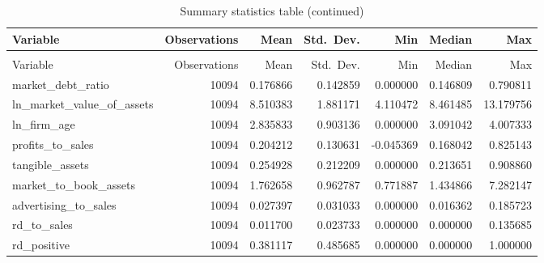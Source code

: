\documentclass{article}
\begin{document}
\begin{longtable}{@{\extracolsep{\fill}}lrrrrrr}
    \caption{Summary statistics table}                                                                      \\
    \toprule
    Variable                      & Observations & Mean     & Std.\ Dev. & Min       & Median   & Max       \\
    \midrule
    \endfirsthead
    \caption[]{Summary statistics table (continued)}                                                        \\
    \toprule
    Variable                      & Observations & Mean     & Std.\ Dev. & Min       & Median   & Max       \\
    \midrule
    \endhead
    \midrule
    \endfoot
    \bottomrule
    \endlastfoot
    market\_debt\_ratio           & 10094        & 0.176866 & 0.142859   & 0.000000  & 0.146809 & 0.790811  \\
    ln\_market\_value\_of\_assets & 10094        & 8.510383 & 1.881171   & 4.110472  & 8.461485 & 13.179756 \\
    ln\_firm\_age                 & 10094        & 2.835833 & 0.903136   & 0.000000  & 3.091042 & 4.007333  \\
    profits\_to\_sales            & 10094        & 0.204212 & 0.130631   & -0.045369 & 0.168042 & 0.825143  \\
    tangible\_assets              & 10094        & 0.254928 & 0.212209   & 0.000000  & 0.213651 & 0.908860  \\
    market\_to\_book\_assets      & 10094        & 1.762658 & 0.962787   & 0.771887  & 1.434866 & 7.282147  \\
    advertising\_to\_sales        & 10094        & 0.027397 & 0.031033   & 0.000000  & 0.016362 & 0.185723  \\
    rd\_to\_sales                 & 10094        & 0.011700 & 0.023733   & 0.000000  & 0.000000 & 0.135685  \\
    rd\_positive                  & 10094        & 0.381117 & 0.485685   & 0.000000  & 0.000000 & 1.000000  \\
\end{longtable}
\end{document}
